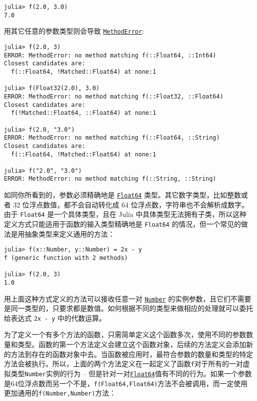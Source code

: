 \begin{verbatim}
julia> f(2.0, 3.0)
7.0
\end{verbatim}



用其它任意的参数类型则会导致 \hyperlink{68769522931907606}{\texttt{MethodError}}:




\begin{verbatim}
julia> f(2.0, 3)
ERROR: MethodError: no method matching f(::Float64, ::Int64)
Closest candidates are:
  f(::Float64, !Matched::Float64) at none:1

julia> f(Float32(2.0), 3.0)
ERROR: MethodError: no method matching f(::Float32, ::Float64)
Closest candidates are:
  f(!Matched::Float64, ::Float64) at none:1

julia> f(2.0, "3.0")
ERROR: MethodError: no method matching f(::Float64, ::String)
Closest candidates are:
  f(::Float64, !Matched::Float64) at none:1

julia> f("2.0", "3.0")
ERROR: MethodError: no method matching f(::String, ::String)
\end{verbatim}



如同你所看到的，参数必须精确地是 \hyperlink{5027751419500983000}{\texttt{Float64}} 类型。其它数字类型，比如整数或者 32 位浮点数值，都不会自动转化成 64 位浮点数，字符串也不会解析成数字。由于 \texttt{Float64} 是一个具体类型，且在 Julia 中具体类型无法拥有子类，所以这种定义方式只能适用于函数的输入类型精确地是 \texttt{Float64} 的情况，但一个常见的做法是用抽象类型来定义通用的方法：




\begin{verbatim}
julia> f(x::Number, y::Number) = 2x - y
f (generic function with 2 methods)

julia> f(2.0, 3)
1.0
\end{verbatim}



用上面这种方式定义的方法可以接收任意一对 \hyperlink{1990584313715697055}{\texttt{Number}} 的实例参数，且它们不需要是同一类型的，只要求都是数值。如何根据不同的类型来做相应的处理就可以委托给表达式 \texttt{2x - y} 中的代数运算。



为了定义一个有多个方法的函数，只需简单定义这个函数多次，使用不同的参数数量和类型。函数的第一个方法定义会建立这个函数对象，后续的方法定义会添加新的方法到存在的函数对象中去。当函数被应用时，最符合参数的数量和类型的特定方法会被执行。所以，上面的两个方法定义在一起定义了函数\texttt{f}对于所有的一对虚拟类型\texttt{Number}实例的行为 – 但是针对一对\hyperlink{5027751419500983000}{\texttt{Float64}}值有不同的行为。如果一个参数是64位浮点数而另一个不是，\texttt{f(Float64,Float64)}方法不会被调用，而一定使用更加通用的\texttt{f(Number,Number)}方法：




